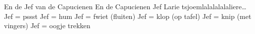 \beginverse
En de Jef van de Capucienen 
En de Capucienen Jef		
Larie tsjoemlalalalalaliere… 
\endverse
\beginverse*
Jef = pssst
Jef = hum
Jef = fwiet (fluiten)
Jef = klop (op tafel)
Jef = knip (met vingers)
Jef = oogje trekken
\endverse
\endsong